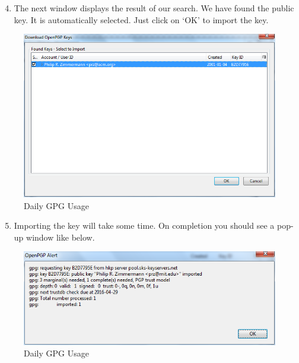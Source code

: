 \begin{enumerate}[1.]
\setcounter{enumi}{3}
\item
  The next window displays the result of our search. We have found the
  public key. It is automatically selected. Just click on `OK' to import
  the key.
\end{enumerate}
\begin{figure}[htbp]
\centering
\includegraphics{daily_gpg_17.png}
\caption{Daily GPG Usage}
\end{figure}

\begin{enumerate}[1.]
\setcounter{enumi}{4}
\item
  Importing the key will take some time. On completion you should see a
  pop-up window like below.
\end{enumerate}
\begin{figure}[htbp]
\centering
\includegraphics{daily_gpg_18.png}
\caption{Daily GPG Usage}
\end{figure}

